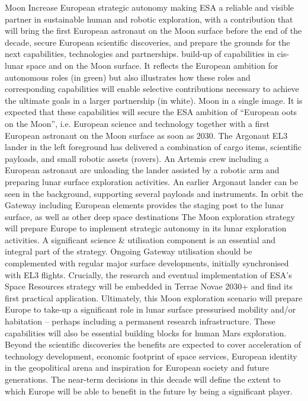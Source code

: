 \documentclass[12pt]{article}
\begin{document}
Moon Increase European strategic autonomy making ESA a reliable and visible partner in sustainable human and robotic exploration, with a contribution that will bring the first European astronaut on the Moon surface before the end of the decade, secure European scientific discoveries, and prepare the grounds for the next capabilities, technologies and partnerships. build-up of capabilities in cis-lunar space and on the Moon surface. It reflects the European ambition for autonomous roles (in green) but also illustrates how these roles and corresponding capabilities will enable selective contributions necessary to achieve the ultimate goals in a larger partnership (in white). Moon in a single image. It is expected that these capabilities will secure the ESA ambition of “European oots on the Moon”, i.e. European science and technology together with a first European astronaut on the Moon surface as soon as 2030. The Argonaut EL3 lander in the left foreground has delivered a combination of cargo items, scientific payloads, and small robotic assets (rovers). An Artemis crew including a European astronaut are unloading the lander assisted by a robotic arm and preparing lunar surface exploration activities. An earlier Argonaut lander can be seen in the background, supporting several payloads and instruments. In orbit the Gateway including European elements provides the staging post to the lunar surface, as well as other deep space destinations The Moon exploration strategy will prepare Europe to implement strategic autonomy in its lunar exploration activities. A significant science \& utilisation component is an essential and integral part of the strategy. Ongoing Gateway utilisation should be complemented with regular major surface developments, initially synchronised with EL3 flights. Crucially, the research and eventual implementation of ESA’s Space Resources strategy will be embedded in Terrae Novae 2030+ and find its first practical application. Ultimately, this Moon exploration scenario will prepare Europe to take-up a significant role in lunar surface pressurised mobility and/or habitation – perhaps including a permanent research infrastructure. These capabilities will also be essential building blocks for human Mars exploration. Beyond the scientific discoveries the benefits are expected to cover acceleration of technology development, economic footprint of space services, European identity in the geopolitical arena and inspiration for European society and future generations. The near-term decisions in this decade will define the extent to which Europe will be able to benefit in the future by being a significant player.
\end{document}
